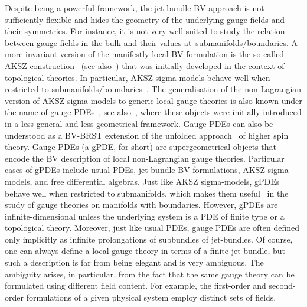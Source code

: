 \documentclass[10pt,a4paper]{amsart}
\numberwithin{equation}{section}
\theoremstyle{definition}
\begin{document}
Despite being a powerful framework, the jet-bundle BV approach is not sufficiently flexible and hides the geometry of the underlying gauge fields and their symmetries. For instance, it is not very well suited to study the relation between gauge fields in the bulk and their values at~submanifolds/boundaries. A more invariant version of the manifestly local BV formulation is the so-called AKSZ construction~\cite{Alexandrov:1995kv} (see also~\cite{Barnich:2009jy,Batalin:2001fc,Bonavolonta:2013mza,Bonechi:2009kx,Cattaneo:1999fm,Cattaneo:2001ys,Grigoriev:1999qz,Ikeda:2012pv,Roytenberg:2002nu}) that was initially developed in the context of topological theories. In particular, AKSZ sigma-models behave well when restricted to submanifolds/boundaries~\cite{Barnich:2003wj,Barnich:2006hbb,Cattaneo:2012qu,Cattaneo:2015vsa, Grigoriev:1999qz}. The generalisation of the non-Lagrangian version of AKSZ sigma-models to generic local gauge theories is also known under the name of gauge PDEs~\cite{Grigoriev:2019ojp}, see also~\cite{Barnich:2010sw, Barnich:2004cr}, where these objects were initially introduced in a less general and less geometrical framework. Gauge PDEs can also be understood as a BV-BRST extension of the unfolded approach~\cite{Vasiliev:1988xc,Vasiliev:2005zu} of higher spin theory.
Gauge PDEs (a gPDE, for short) are supergeometrical objects that encode the BV description of local non-Lagrangian gauge theories. Particular cases of gPDEs include usual PDEs, jet-bundle BV formulations, AKSZ sigma-models, and free differential algebras. Just like AKSZ sigma-models, gPDEs behave well when restricted to submanifolds, which makes them useful~\cite{Bekaert:2013zya,Bekaert:2012vt,Bekaert:2017bpy,Chekmenev:2015kzf,Grigoriev:2023kkk} in the study of gauge theories on manifolds with boundaries. However, gPDEs are infinite-dimensional unless the underlying system is a PDE of finite type or a
topological theory. Moreover, just like usual PDEs, gauge PDEs are often defined only implicitly as infinite prolongations of subbundles of jet-bundles. Of course, one can always define a local gauge theory in terms of a finite jet-bundle, but such a description is far from being elegant and is very ambiguous. The ambiguity arises, in particular, from the fact that the same gauge theory can be formulated using different field content. For example, the first-order and second-order formulations of a given physical system employ distinct sets of fields.
\end{document}
